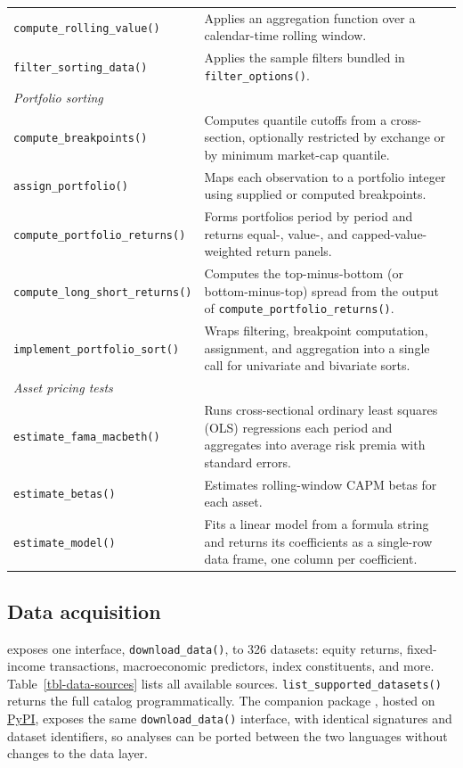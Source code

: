 \documentclass[
  article]{jss}
\begin{document}
\begin{longtable}[]{@{}
  >{\raggedright\arraybackslash}p{}
  >{\raggedright\arraybackslash}p{}@{}}
\texttt{compute\_rolling\_value()} & Applies an aggregation function
over a calendar-time rolling window. \\
\texttt{filter\_sorting\_data()} & Applies the sample filters bundled in
\texttt{filter\_options()}. \\
\emph{Portfolio sorting} & \\
\texttt{compute\_breakpoints()} & Computes quantile cutoffs from a
cross-section, optionally restricted by exchange or by minimum
market-cap quantile. \\
\texttt{assign\_portfolio()} & Maps each observation to a portfolio
integer using supplied or computed breakpoints. \\
\texttt{compute\_portfolio\_returns()} & Forms portfolios period by
period and returns equal-, value-, and capped-value-weighted return
panels. \\
\texttt{compute\_long\_short\_returns()} & Computes the top-minus-bottom
(or bottom-minus-top) spread from the output of
\texttt{compute\_portfolio\_returns()}. \\
\texttt{implement\_portfolio\_sort()} & Wraps filtering, breakpoint
computation, assignment, and aggregation into a single call for
univariate and bivariate sorts. \\
\emph{Asset pricing tests} & \\
\texttt{estimate\_fama\_macbeth()} & Runs cross-sectional ordinary least
squares (OLS) regressions each period and aggregates into average risk
premia with \citet{newey.1987} standard errors. \\
\texttt{estimate\_betas()} & Estimates rolling-window CAPM betas for
each asset. \\
\texttt{estimate\_model()} & Fits a linear model from a formula string
and returns its coefficients as a single-row data frame, one column per
coefficient. \\
\end{longtable}

\endgroup

\subsection{Data acquisition}\label{sec-data-access}

 exposes one interface, \texttt{download\_data()}, to
326 datasets: equity returns, fixed-income transactions, macroeconomic
predictors, index constituents, and more. Table~\ref{tbl-data-sources}
lists all available sources. \texttt{list\_supported\_datasets()}
returns the full catalog programmatically. The companion
 package , hosted on
\href{https://pypi.org/project/tidyfinance/}{PyPI}, exposes the same
\texttt{download\_data()} interface, with identical signatures and
dataset identifiers, so analyses can be ported between the two languages
without changes to the data layer.
\end{document}
